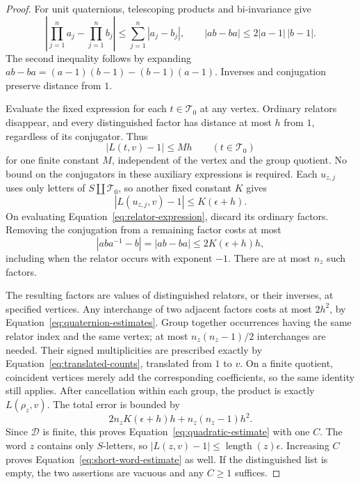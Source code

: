 \begin{proof}
For unit quaternions, telescoping products and bi-invariance give
\begin{equation}\label{eq:quaternion-estimates}
 \left|\prod_{j=1}^n a_j-\prod_{j=1}^n b_j\right|
       \le\sum_{j=1}^n|a_j-b_j|,
 \qquad
 |ab-ba|\le2|a-1|\,|b-1|.
\end{equation}
The second inequality follows by expanding
$ab-ba=(a-1)(b-1)-(b-1)(a-1)$.
Inverses and conjugation preserve distance from $1$.

Evaluate the fixed expression for each $t\in\mathcal T_0$ at any vertex.
Ordinary relators disappear, and every distinguished factor has
distance at most $h$ from $1$, regardless of its conjugator.  Thus
\[
 |L(t,v)-1|\le M h\qquad(t\in\mathcal T_0)
\]
for one finite constant $M$, independent of the vertex and the group
quotient.  No bound on the conjugators in these auxiliary expressions
is required.  Each $u_{z,j}$ uses only letters of $S\amalg\mathcal T_0$, so another
fixed constant $K$ gives
\[
 |L(u_{z,j},v)-1|\le K(\epsilon+h).
\]
On evaluating Equation~\eqref{eq:relator-expression}, discard its
ordinary factors.  Removing the conjugation from a remaining factor
costs at most
\[
 |aba^{-1}-b|=|ab-ba|
       \le 2K(\epsilon+h)h,
\]
including when the relator occurs with exponent $-1$.
There are at most $n_z$ such factors.

The resulting factors are values of distinguished relators, or their
inverses, at specified vertices.  Any interchange of two adjacent
factors costs at most $2h^2$, by
Equation~\eqref{eq:quaternion-estimates}.  Group together occurrences
having the same relator index and the same vertex; at most
$n_z(n_z-1)/2$ interchanges are needed.  Their signed multiplicities
are prescribed exactly by Equation~\eqref{eq:translated-counts},
translated from $1$ to $v$.  On a finite quotient, coincident vertices
merely add the corresponding coefficients, so the same identity
still applies.  After cancellation within each group, the product is
exactly $L(\rho_z,v)$.  The total error is bounded by
\[
 2n_zK(\epsilon+h)h+n_z(n_z-1)h^2.
\]
Since $\mathcal D$ is finite, this proves
Equation~\eqref{eq:quadratic-estimate} with one $C$.
The word $z$ contains only $S$-letters, so
$|L(z,v)-1|\le\operatorname{length}(z)\epsilon$.
Increasing $C$ proves Equation~\eqref{eq:short-word-estimate} as well.
If the distinguished list is empty, the two assertions are vacuous
and any $C\ge1$ suffices.
\end{proof}

